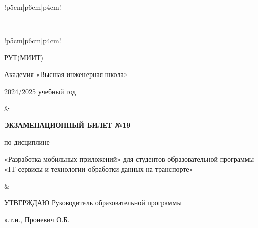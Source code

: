 \documentclass[a4paper]{article}
\begin{document}
\begin{tabular}{!{\vrule width 2pt}p{5cm}|p{6cm}|p{4cm}!{\vrule width 2pt}}
{\begin{minipage}{16cm}
\vspace{0.2cm}
    
\end{minipage}
}
\\
\end{tabular}

\newpage


\begin{tabular}{!{\vrule width 2pt}p{5cm}|p{6cm}|p{4cm}!{\vrule width 2pt}}

    {\centering 
    \fontsize{14pt}{16pt}\selectfont
    РУТ(МИИТ)

\vspace{14pt}

Академия «Высшая инженерная школа»

\vspace{14pt}

2024/2025 учебный год

    }
&
{
    \centering
\fontsize{14pt}{16pt}\selectfont

\textbf{ЭКЗАМЕНАЦИОННЫЙ
БИЛЕТ №19}


по дисциплине 

«Разработка мобильных приложений» 
\fontsize{12pt}{14pt}\selectfont
для студентов образовательной программы «IT-сервисы и технологии обработки данных на транспорте»

}
&
{
\centering
\fontsize{14pt}{16pt}\selectfont

УТВЕРЖДАЮ
Руководитель образовательной программы

\vspace{1cm}

\fontsize{12pt}{14pt}\selectfont
\underline{\hspace{3cm}}

к.т.н., \underline{Проневич О.Б.}

}
\\
\hline
{}
\end{tabular}
\end{document}
